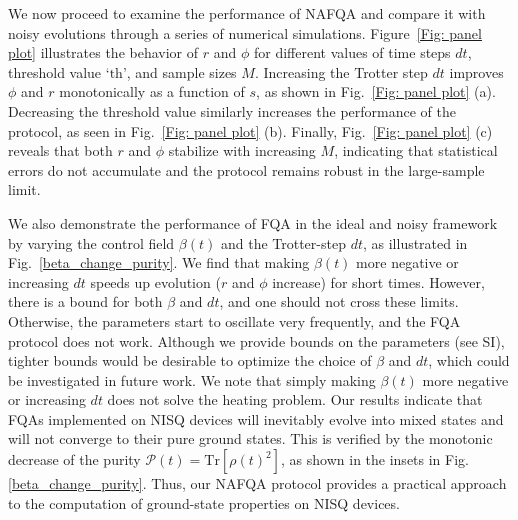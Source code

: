 \documentclass[10pt, superscriptaddress,aps,pra,twocolumn,showpacs,nofootinbib, longbibliography, notitlepage,floatfix]{revtex4-2}
\begin{document}
We now proceed to examine the performance of NAFQA and compare it with noisy evolutions through a series of numerical simulations. Figure~\ref{Fig: panel plot} illustrates the behavior of $r$ and $\phi$ for different values of time steps $dt$, threshold value `$\text{th}$', and sample sizes $M$. Increasing the Trotter step $dt$ improves $\phi$ and $r$ monotonically as a function of $s$, as shown in Fig.~\ref{Fig: panel plot} (a). Decreasing the threshold value similarly increases the performance of the protocol, as seen in Fig.~\ref{Fig: panel plot} (b). Finally, Fig.~\ref{Fig: panel plot} (c) reveals that both $r$ and $\phi$ stabilize with increasing $M$, indicating that statistical errors do not accumulate and the protocol remains robust in the large-sample limit. 

We also demonstrate the performance of FQA in the ideal and noisy framework by varying the control field $\beta(t)$ and the Trotter-step $dt$, as illustrated in Fig.~\ref{beta_change_purity}. We find that making $\beta(t)$ more negative or increasing $dt$ speeds up evolution ($r$ and $\phi$ increase) for short times. However, there is a bound for both $\beta$ and $dt$, and one should not cross these limits. Otherwise, the parameters start to oscillate very frequently, and the FQA protocol does not work. Although we provide bounds on the parameters (see SI), tighter bounds would be desirable to optimize the choice of $\beta$ and $dt$, which could be investigated in future work. We note that simply making $\beta(t)$ more negative or increasing $dt$ does not solve the heating problem. 
Our results indicate that FQAs implemented on NISQ devices will inevitably evolve into mixed states and will not converge to their pure ground states.
This is verified by the monotonic decrease of the purity $\mathcal{P}(t) = \text{Tr}[\rho(t)^2]$, as shown in the insets in Fig. \ref{beta_change_purity}. Thus, our NAFQA protocol provides a practical approach to the computation of ground-state properties on NISQ devices.
\end{document}
